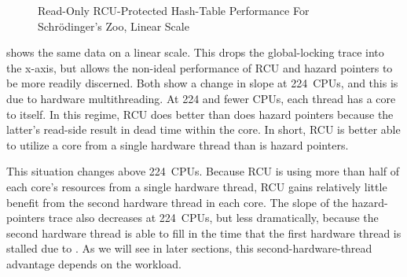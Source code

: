 \begin{figure}
\centering
{}
\caption{Read-Only RCU-Protected Hash-Table Performance For Schr\"odinger's Zoo, Linear Scale}
\label{fig:datastruct:Read-Only RCU-Protected Hash-Table Performance For Schroedinger's Zoo; Linear Scale}
\end{figure}

shows the same data on a linear scale.
This drops the global-locking trace into the x-axis, but allows the
non-ideal performance of RCU and hazard pointers to be more readily
discerned.
Both show a change in slope at 224~CPUs, and this is due to hardware
multithreading.
At 224 and fewer CPUs, each thread has a core to itself.
In this regime, RCU does better than does hazard pointers because the
latter's read-side  result in dead time within the core.
In short, RCU is better able to utilize a core from a single hardware
thread than is hazard pointers.

This situation changes above 224~CPUs.
Because RCU is using more than half of each core's resources from a
single hardware thread, RCU gains relatively little benefit from the
second hardware thread in each core.
The slope of the hazard-pointers trace also decreases at 224~CPUs, but
less dramatically,
because the second hardware thread is able to fill in the time
that the first hardware thread is stalled due to .
As we will see in later sections, this second-hardware-thread
advantage depends on the workload.

